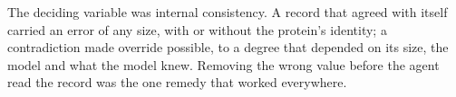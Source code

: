 The deciding variable was internal consistency. A record that agreed with itself carried an error of any size, with or without the protein's identity; a contradiction made override possible, to a degree that depended on its size, the model and what the model knew. Removing the wrong value before the agent read the record was the one remedy that worked everywhere.
